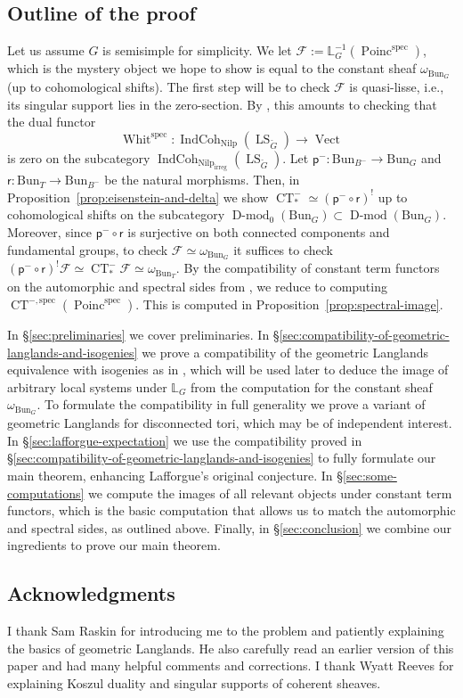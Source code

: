 \documentclass[11pt]{amsart}
\newcommand{\cF}{\mathcal{F}}
\newcommand{\irreg}{\mathrm{irreg}}
\newcommand{\spec}{\mathrm{spec}}
\newcommand{\Vect}{\operatorname{Vect}}
\newcommand{\Bun}{{\mathrm{Bun}}}
\newcommand{\Whit}{\operatorname{Whit}}
\newcommand{\CT}{\operatorname{CT}}
\newcommand{\Poinc}{\operatorname{Poinc}}
\newcommand{\pp}{{\mathsf{p}}}
\newcommand{\rr}{{\mathsf{r}}}
\newcommand{\Nilp}{\mathrm{Nilp}}
\DeclareMathOperator{\Dmod}{D-mod}
\DeclareMathOperator{\IndCoh}{IndCoh}
\DeclareMathOperator{\LS}{LS}
\theoremstyle{remark}
\theoremstyle{definition}
\begin{document}
\subsection{Outline of the proof} Let us assume $G$ is semisimple for simplicity. We let $\cF:=\mathbb L_G^{-1}(\Poinc^\spec)$, which is the mystery object we hope to show is equal to the constant sheaf $\omega_{\Bun_G}$ (up to cohomological shifts). The first step will be to check $\cF$ is quasi-lisse, i.e., its singular support lies in the zero-section. By \cite[Theorem~A]{quasi-temp}, this amounts to checking that the dual functor
\[
\Whit^\spec\colon\IndCoh_{\Nilp}(\LS_{\check G})\to\Vect
\]
is zero on the subcategory $\IndCoh_{\Nilp_\irreg}(\LS_{\check G})$. Let $\pp^-\colon\Bun_{B^-}\to\Bun_G$ and $\rr\colon\Bun_T\to\Bun_{B^-}$ be the natural morphisms. Then, in Proposition~\ref{prop:eisenstein-and-delta} we show $\CT_*^-\simeq(\pp^-\circ\rr)^!$ up to cohomological shifts on the subcategory $\Dmod_0(\Bun_G)\subset\Dmod(\Bun_G)$. Moreover, since $\pp^-\circ\rr$ is surjective on both connected components and fundamental groups, to check $\cF\simeq\omega_{\Bun_G}$ it suffices to check $(\pp^-\circ\rr)^!\cF\simeq\CT^-_*\cF\simeq\omega_{\Bun_T}$. By the compatibility of constant term functors on the automorphic and spectral sides from \cite{GLC3}, we reduce to computing $\CT^{-,\spec}(\Poinc^\spec)$. This is computed in Proposition~\ref{prop:spectral-image}.


In \S\ref{sec:preliminaries} we cover preliminaries. In \S\ref{sec:compatibility-of-geometric-langlands-and-isogenies} we prove a compatibility of the geometric Langlands equivalence with isogenies as in \cite[\S5.4]{GLC5}, which will be used later to deduce the image of arbitrary local systems under $\mathbb L_G$ from the computation for the constant sheaf $\omega_{\Bun_G}$. To formulate the compatibility in full generality we prove a variant of geometric Langlands for disconnected tori, which may be of independent interest. In \S\ref{sec:lafforgue-expectation} we use the compatibility proved in \S\ref{sec:compatibility-of-geometric-langlands-and-isogenies} to fully formulate our main theorem, enhancing Lafforgue's original conjecture. In \S\ref{sec:some-computations} we compute the images of all relevant objects under constant term functors, which is the basic computation that allows us to match the automorphic and spectral sides, as outlined above. Finally, in \S\ref{sec:conclusion} we combine our ingredients to prove our main theorem.

\subsection{Acknowledgments} I thank Sam Raskin for introducing me to the problem and patiently explaining the basics of geometric Langlands. He also carefully read an earlier version of this paper and had many helpful comments and corrections. I thank Wyatt Reeves for explaining Koszul duality and singular supports of coherent sheaves. 
\end{document}

